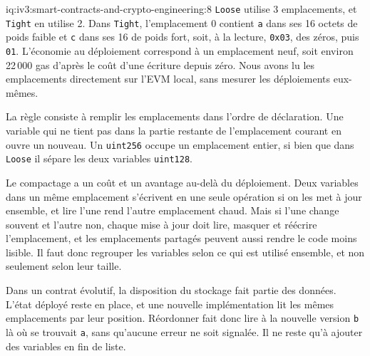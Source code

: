 \begin{solution}{iq:iv3:smart-contracts-and-crypto-engineering:8}
\texttt{Loose} utilise 3 emplacements, et \texttt{Tight} en utilise 2. Dans \texttt{Tight}, l'emplacement 0 contient \texttt{a} dans ses 16 octets de poids faible et \texttt{c} dans ses 16 de poids fort, soit, à la lecture, \texttt{0x03}, des zéros, puis \texttt{01}. L'économie au déploiement correspond à un emplacement neuf, soit environ 22\,000 gas d'après le coût d'une écriture depuis zéro. Nous avons lu les emplacements directement sur l'EVM local, sans mesurer les déploiements eux-mêmes.

La règle consiste à remplir les emplacements dans l'ordre de déclaration. Une variable qui ne tient pas dans la partie restante de l'emplacement courant en ouvre un nouveau. Un \texttt{uint256} occupe un emplacement entier, si bien que dans \texttt{Loose} il sépare les deux variables \texttt{uint128}.

Le compactage a un coût et un avantage au-delà du déploiement. Deux variables dans un même emplacement s'écrivent en une seule opération si on les met à jour ensemble, et lire l'une rend l'autre emplacement chaud. Mais si l'une change souvent et l'autre non, chaque mise à jour doit lire, masquer et réécrire l'emplacement, et les emplacements partagés peuvent aussi rendre le code moins lisible. Il faut donc regrouper les variables selon ce qui est utilisé ensemble, et non seulement selon leur taille.

Dans un contrat évolutif, la disposition du stockage fait partie des données. L'état déployé reste en place, et une nouvelle implémentation lit les mêmes emplacements par leur position. Réordonner fait donc lire à la nouvelle version \texttt{b} là où se trouvait \texttt{a}, sans qu'aucune erreur ne soit signalée. Il ne reste qu'à ajouter des variables en fin de liste.

\end{solution}

